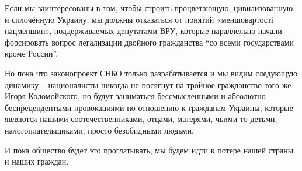 Если мы заинтересованы в том, чтобы строить процветающую, цивилизованную и
сплочённую Украину, мы должны отказаться от понятий «меншовартості нацменшин»,
поддерживаемых депутатами ВРУ, которые параллельно начали форсировать вопрос
легализации двойного гражданства ``со всеми государствами кроме России''. 

Но пока что законопроект СНБО только разрабатывается и мы видим следующую
динамику – националисты никогда не посягнут на тройное гражданство того же
Игоря Коломойского, но будут заниматься бессмысленными и абсолютно
беспрецендентыми провокациями по отношению к гражданам Украины, которые
являются нашими соотечественниками, отцами, матерями, чьими-то детьми,
налогоплательщиками, просто безобидными людьми. 

И пока общество будет это проглатывать, мы будем идти к потере нашей страны и
наших граждан.
